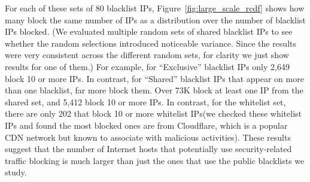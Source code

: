 
For each of these sets of 80 blacklist IPs,
Figure~\ref{fig:large_scale_rcdf} shows how many {} block
the same number of IPs as a distribution over the number of blacklist
IPs blocked.  (We evaluated multiple random sets of shared blacklist
IPs to see whether the random selections introduced noticeable
variance.  Since the results were very consistent across the different
random sets, for clarity we just show results for one of them.)  For
example, for ``Exclusive'' blacklist IPs only 2,649 {}
block 10 or more IPs.  In contrast, for ``Shared'' blacklist IPs that
appear on more than one blacklist, far more {} block them.
Over 73K {} block at least one IP from the shared set, and
5,412 {} block 10 or more IPs.  In contrast, for the
whitelist set, there are only 202 {} that block 10 or more
whitelist IPs(we checked these whitelist IPs and found the most blocked
ones are from Cloudflare, which is a popular CDN network but
known to associate with malicious activities).
These results suggest that the number of Internet
hosts that potentially use security-related traffic blocking is much
larger than just the ones that use the public blacklists we study.


